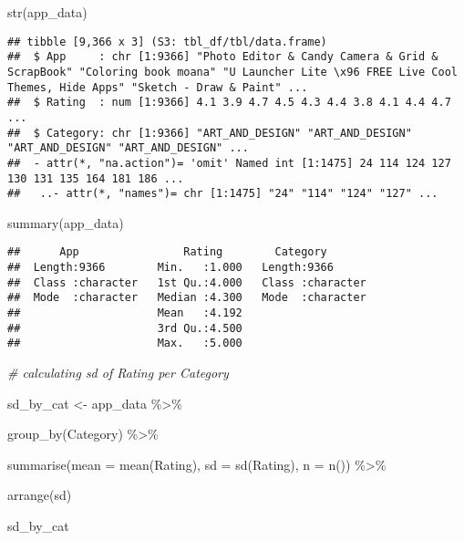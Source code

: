 \documentclass[
]{article}
\newenvironment{Shaded}{\begin{snugshade}}{\end{snugshade}}
\newcommand{\AttributeTok}[1]{\textcolor[rgb]{0.77,0.63,0.00}{#1}}
\newcommand{\CommentTok}[1]{\textcolor[rgb]{0.56,0.35,0.01}{\textit{#1}}}
\newcommand{\FunctionTok}[1]{\textcolor[rgb]{0.00,0.00,0.00}{#1}}
\newcommand{\NormalTok}[1]{#1}
\newcommand{\OtherTok}[1]{\textcolor[rgb]{0.56,0.35,0.01}{#1}}
\newcommand{\SpecialCharTok}[1]{\textcolor[rgb]{0.00,0.00,0.00}{#1}}
\begin{document}
\begin{Shaded}
\begin{Highlighting}[]
\FunctionTok{str}\NormalTok{(app\_data)}
\end{Highlighting}
\end{Shaded}

\begin{verbatim}
## tibble [9,366 x 3] (S3: tbl_df/tbl/data.frame)
##  $ App     : chr [1:9366] "Photo Editor & Candy Camera & Grid & ScrapBook" "Coloring book moana" "U Launcher Lite \x96 FREE Live Cool Themes, Hide Apps" "Sketch - Draw & Paint" ...
##  $ Rating  : num [1:9366] 4.1 3.9 4.7 4.5 4.3 4.4 3.8 4.1 4.4 4.7 ...
##  $ Category: chr [1:9366] "ART_AND_DESIGN" "ART_AND_DESIGN" "ART_AND_DESIGN" "ART_AND_DESIGN" ...
##  - attr(*, "na.action")= 'omit' Named int [1:1475] 24 114 124 127 130 131 135 164 181 186 ...
##   ..- attr(*, "names")= chr [1:1475] "24" "114" "124" "127" ...
\end{verbatim}

\begin{Shaded}
\begin{Highlighting}[]
\FunctionTok{summary}\NormalTok{(app\_data)}
\end{Highlighting}
\end{Shaded}

\begin{verbatim}
##      App                Rating        Category        
##  Length:9366        Min.   :1.000   Length:9366       
##  Class :character   1st Qu.:4.000   Class :character  
##  Mode  :character   Median :4.300   Mode  :character  
##                     Mean   :4.192                     
##                     3rd Qu.:4.500                     
##                     Max.   :5.000
\end{verbatim}

\begin{Shaded}
\begin{Highlighting}[]
\CommentTok{\# calculating sd of Rating per Category}

\NormalTok{sd\_by\_cat }\OtherTok{\textless{}{-}}\NormalTok{ app\_data }\SpecialCharTok{\%\textgreater{}\%}

  \FunctionTok{group\_by}\NormalTok{(Category) }\SpecialCharTok{\%\textgreater{}\%}

  \FunctionTok{summarise}\NormalTok{(}\AttributeTok{mean =} \FunctionTok{mean}\NormalTok{(Rating), }\AttributeTok{sd =} \FunctionTok{sd}\NormalTok{(Rating), }\AttributeTok{n =} \FunctionTok{n}\NormalTok{()) }\SpecialCharTok{\%\textgreater{}\%}

  \FunctionTok{arrange}\NormalTok{(sd)}

\NormalTok{sd\_by\_cat}
\end{Highlighting}
\end{Shaded}
\end{document}
